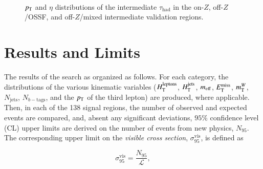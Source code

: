 \begin{figure}[tbp]
  \hfill
   \\
  \caption{$p_{\text{T}}$ and $\eta$ distributions of the intermediate $\tau_{\mathrm{had}}$ in the on-$Z$, off-$Z$/OSSF, and off-$Z$/mixed intermediate validation regions. }
  \label{fig:model-independent-VR-intermediate-tau}
\end{figure}


\section{Results and Limits}\label{sec:model-independent-results}
The results of the search as organized as follows. For each category, the distributions of the various kinematic variables ($H_{\mathrm{T}}^{\mathrm{leptons}}$, $H_{\mathrm{T}}^{\mathrm{jets}}$, $m_{\mathrm{eff}}$, $E_{\text{T}}^{\text{miss}}$, $m_{\mathrm{T}}^W$, $N_{\mathrm{jets}}$, $N_{b-\mathrm{tags}}$, and the $p_{\text{T}}$ of the third lepton) are produced, where applicable. Then, in each of the 138 signal regions, the number of observed and expected events are compared, and, absent any significant deviations, $95\%$ confidence level (CL) upper limits are derived on the number of events from new physics, $N_{95}$. The corresponding upper limit on the \emph{visible cross section}, $\sigma_{95}^{\mathrm{vis}}$, is defined as

\begin{equation}
	\sigma_{95}^{\mathrm{vis}} = \frac{N_{95}}{\mathcal{L}},
\end{equation}


